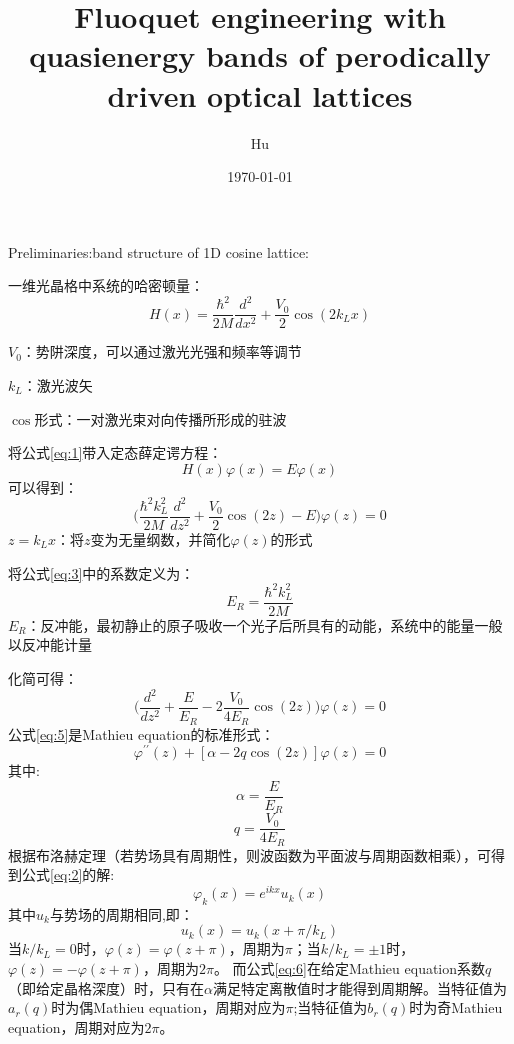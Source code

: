 \documentclass{article}
\title{Fluoquet engineering with quasienergy bands of perodically driven optical lattices}
\author{Hu}
\date{\today}
\begin{document}
	\maketitle
	 Preliminaries:band structure of 1D cosine lattice:
	
	一维光晶格中系统的哈密顿量：
	\begin{equation}
		H(x)=\frac{\hbar^2}{2M}\frac{d^2}{dx^2}+\frac{V_0}{2}\cos(2k_Lx) \label{eq:1}
	\end{equation}
	
	$V_0$：势阱深度，可以通过激光光强和频率等调节
	
	$k_L$：激光波矢
	
	$\cos$形式：一对激光束对向传播所形成的驻波
	
	将公式\ref{eq:1}带入定态薛定谔方程：
	\begin{equation}
		H(x)\varphi(x)=E\varphi(x) \label{eq:2}
	\end{equation}
	可以得到：
	\begin{equation}
		\bigg(\frac{\hbar^2k_L^2}{2M}\frac{d^2}{dz^2}+\frac{V_0}{2}\cos(2z)-E\bigg)\varphi(z)=0  \label{eq:3}
	\end{equation}
	$z=k_Lx$：将$z$变为无量纲数，并简化$\varphi(z)$的形式
	
	将公式\ref{eq:3}中的系数定义为：
	\begin{equation}
		E_R=\frac{\hbar^2k_L^2}{2M} \label{eq:4}
	\end{equation}
	$E_R$：反冲能，最初静止的原子吸收一个光子后所具有的动能，系统中的能量一般以反冲能计量
	
	化简可得：
	\begin{equation}
		\bigg(\frac{d^2}{dz^2}+\frac{E}{E_R}-2\frac{V_0}{4E_R}\cos(2z)\bigg)\varphi(z)=0 \label{eq:5}
	\end{equation}
	公式\ref{eq:5}是Mathieu equation的标准形式：
	\begin{equation}
		\varphi^{\prime\prime}(z)+[\alpha-2q\cos(2z)]\varphi(z)=0 \label{eq:6}
	\end{equation}
	其中:
	\begin{equation}
		\alpha=\frac{E}{E_R} \label{eq:7}
	\end{equation}
	\begin{equation}
		q=\frac{V_0}{4E_R} \label{eq:8}
	\end{equation}
	根据布洛赫定理（若势场具有周期性，则波函数为平面波与周期函数相乘），可得到公式\ref{eq:2}的解:
	\begin{equation}
		\varphi_k(x)=e^{ikx}u_k(x) \label{eq:9}
	\end{equation}
	其中$u_k$与势场的周期相同,即：
	\begin{equation}
		u_k(x)=u_k(x+\pi/k_L) \label{eq:10}
	\end{equation}	
	当$k/k_L=0$时，$\varphi(z)=\varphi(z+\pi)$，周期为$\pi$；当$k/k_L=\pm1$时，$\varphi(z)=-\varphi(z+\pi)$，周期为$2\pi$。
	而公式\ref{eq:6}在给定Mathieu equation系数$q$（即给定晶格深度）时，只有在$\alpha$满足特定离散值时才能得到周期解。当特征值为$a_r(q)$时为偶Mathieu equation，周期对应为$\pi$;当特征值为$b_r(q)$时为奇Mathieu equation，周期对应为$2\pi$。
	
\end{document}
